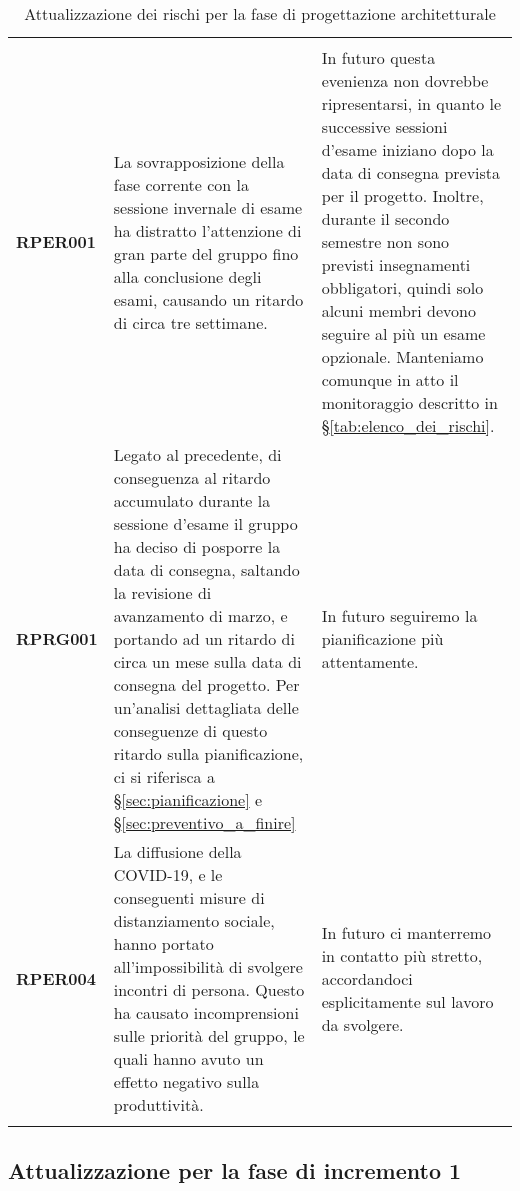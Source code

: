 \documentclass[../piano-di-progetto]{subfiles}
\begin{document}
\begin{longtable}[H]{|p{10em}|p{17em}|p{17em}|}
  \rowcolor{darkgray!90!}
  \color{white}{\textbf{Rischio}} & \color{white}{\textbf{Gestione}} & \color{white}{\textbf{Monitoraggio}} \\
  \textbf{RPER001} & La sovrapposizione della fase corrente con la sessione invernale di esame ha distratto l'attenzione di gran parte del gruppo fino alla conclusione degli esami, causando un ritardo di circa tre settimane. & In futuro questa evenienza non dovrebbe ripresentarsi, in quanto le successive sessioni d'esame iniziano dopo la data di consegna prevista per il progetto. Inoltre, durante il secondo semestre non sono previsti insegnamenti obbligatori, quindi solo alcuni membri devono seguire al più un esame opzionale. Manteniamo comunque in atto il monitoraggio descritto in §\ref{tab:elenco_dei_rischi}. \\
  \textbf{RPRG001} & Legato al precedente, di conseguenza al ritardo accumulato durante la sessione d'esame il gruppo ha deciso di posporre la data di consegna, saltando la revisione di avanzamento di marzo, e portando ad un ritardo di circa un mese sulla data di consegna del progetto. Per un'analisi dettagliata delle conseguenze di questo ritardo sulla pianificazione, ci si riferisca a §\ref{sec:pianificazione} e §\ref{sec:preventivo_a_finire} & In futuro seguiremo la pianificazione più attentamente. \\
  \textbf{RPER004} & La diffusione della COVID-19, e le conseguenti misure di distanziamento sociale, hanno portato all'impossibilità di svolgere incontri di persona. Questo ha causato incomprensioni sulle priorità del gruppo, le quali hanno avuto un effetto negativo sulla produttività. & In futuro ci manterremo in contatto più stretto, accordandoci esplicitamente sul lavoro da svolgere. \\
  \rowcolor{white}
  \caption{Attualizzazione dei rischi per la fase di progettazione architetturale}%
  \label{tab:attualizzazione_per_la_fase_di_progettazione_architetturale}
\end{longtable}

\subsection{Attualizzazione per la fase di incremento 1}%
\label{sub:attualizzazione_per_la_fase_di_incremento_1}
\end{document}
